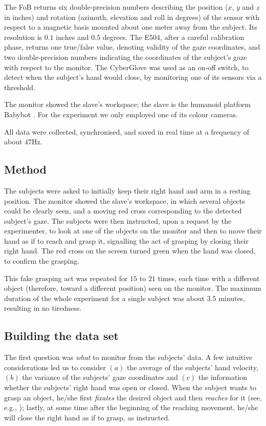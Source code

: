 The FoB returns six double-precision numbers describing the position
($x$, $y$ and $z$ in inches) and rotation (azimuth, elevation and roll
in degrees) of the sensor with respect to a magnetic basis mounted
about one meter away from the subject. Its resolution is $0.1$ inches
and $0.5$ degrees. The E504, after a careful calibration phase,
returns one true/false value, denoting validity of the gaze
coordinates, and two double-precision numbers indicating the
coordinates of the subject's gaze with respect to the monitor. The
CyberGlove was used as an on-off switch, to detect when the subject's
hand would close, by monitoring one of its sensors via a threshold.

The monitor showed the slave's workspace; the slave is the humanoid
platform Babybot \cite{babybotHum2005}. For the experiment we only
employed one of its colour cameras.

All data were collected, synchronised, and saved in real time at a
frequency of about $47$Hz.

\subsection{Method}

The subjects were asked to initially keep their right hand and arm in
a resting position. The monitor showed the slave's workspace, in which
several objects could be clearly seen, and a moving red cross
corresponding to the detected subject's gaze. The subjects were then
instructed, upon a request by the experimenter, to look at one of the
objects on the monitor and then to move their hand as if to reach and
grasp it, signalling the act of grasping by closing their right
hand. The red cross on the screen turned green when the hand was
closed, to confirm the grasping.

This fake grasping act was repeated for $15$ to $21$ times, each time
with a different object (therefore, toward a different position) seen
on the monitor. The maximum duration of the whole experiment for a
single subject was about $3.5$ minutes, resulting in no tiredness.

\subsection{Building the data set}
\label{subsec:dataset}

The first question was \emph{what} to monitor from the subjects'
data. A few intuitive considerations led us to consider $(a)$ the
average of the subjects' hand velocity, $(b)$ the variance of the
subjects' gaze coordinates and $(c)$ the information whether the
subjects' right hand was open or closed. When the subject wants to
grasp an object, he/she first \emph{fixates} the desired object and
then \emph{reaches} for it (see, e.g., \cite{johansson01}); lastly, at
some time after the beginning of the reaching movement, he/she will
close the right hand as if to grasp, as instructed.

